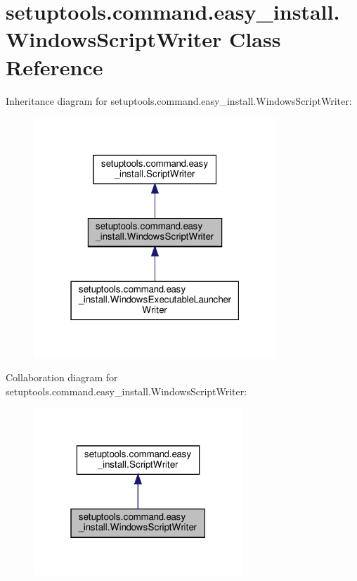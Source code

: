 \hypertarget{classsetuptools_1_1command_1_1easy__install_1_1WindowsScriptWriter}{}\section{setuptools.\+command.\+easy\+\_\+install.\+Windows\+Script\+Writer Class Reference}
\label{classsetuptools_1_1command_1_1easy__install_1_1WindowsScriptWriter}


Inheritance diagram for setuptools.\+command.\+easy\+\_\+install.\+Windows\+Script\+Writer\+:
\nopagebreak
\begin{figure}[H]
\begin{center}
\leavevmode
\includegraphics[width=259pt]{classsetuptools_1_1command_1_1easy__install_1_1WindowsScriptWriter__inherit__graph}
\end{center}
\end{figure}


Collaboration diagram for setuptools.\+command.\+easy\+\_\+install.\+Windows\+Script\+Writer\+:
\nopagebreak
\begin{figure}[H]
\begin{center}
\leavevmode
\includegraphics[width=223pt]{classsetuptools_1_1command_1_1easy__install_1_1WindowsScriptWriter__coll__graph}
\end{center}
\end{figure}
